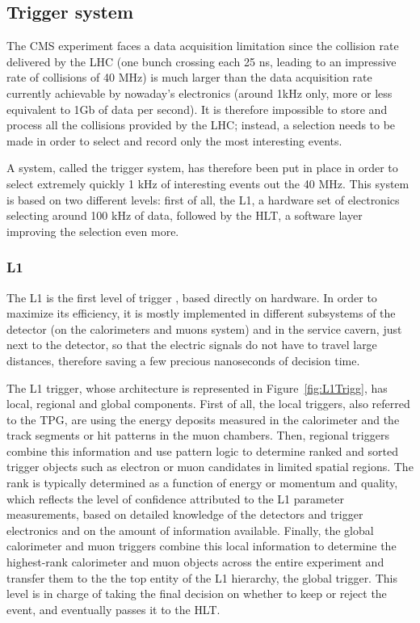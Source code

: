 \documentclass[a4paper, 10pt, openright]{report}
\begin{document}
\subsection{Trigger system} \label{subsection:Trigger}

The \ac{CMS} experiment faces a data acquisition limitation since the collision rate delivered by the \ac{LHC} (one bunch crossing each 25 ns, leading to an impressive rate of collisions of 40 MHz) is much larger than the data acquisition rate currently achievable by nowaday's electronics (around 1kHz only, more or less equivalent to 1Gb of data per second). It is therefore impossible to store and process all the collisions provided by the \ac{LHC}; instead, a selection needs to be made in order to select and record only the most interesting events.

A system, called the trigger system, has therefore been put in place in order to select extremely quickly 1 kHz of interesting events out the 40 MHz. This system is based on two different levels: first of all, the \ac{L1}, a hardware set of electronics selecting around 100 kHz of data, followed by the \ac{HLT}, a software layer improving the selection even more.%

\subsubsection*{\acf{L1}}

The \ac{L1} is the first level of trigger \cite{L1}, based directly on hardware. In order to maximize its efficiency, it is mostly implemented in different subsystems of the detector (on the calorimeters and muons system) and in the service cavern, just next to the detector, so that the electric signals do not have to travel large distances, therefore saving a few precious nanoseconds of decision time. 

The L1 trigger, whose architecture is represented in Figure~\ref{fig:L1Trigg}, has local, regional and global components. First of all, the local triggers, also referred to the \ac{TPG}, are using the energy deposits measured in the calorimeter and the track segments or hit patterns in the muon chambers. Then, regional triggers combine this information and use pattern logic to determine ranked and sorted trigger objects
such as electron or muon candidates in limited spatial regions. The rank is typically determined as a function of energy or momentum and quality, which reflects the level of confidence attributed to the L1 parameter measurements, based on detailed knowledge of the detectors and trigger electronics
and on the amount of information available. Finally, the global calorimeter and muon triggers combine this local information to determine the highest-rank calorimeter and muon objects across the entire experiment and transfer them to the the top entity of the L1 hierarchy, the global trigger. This level is in charge of taking the final decision on whether to keep or reject the event, and eventually passes it to the \ac{HLT}.
\end{document}
